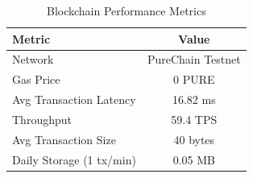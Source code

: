 \begin{table}[h]
\centering
\caption{Blockchain Performance Metrics}
\begin{tabular}{lc}
\hline
Metric & Value \\
\hline
Network & PureChain Testnet \\
Gas Price & 0 PURE \\
Avg Transaction Latency & 16.82 ms \\
Throughput & 59.4 TPS \\
Avg Transaction Size & 40 bytes \\
Daily Storage (1 tx/min) & 0.05 MB \\
\hline
\end{tabular}
\label{tab:blockchain}
\end{table}
